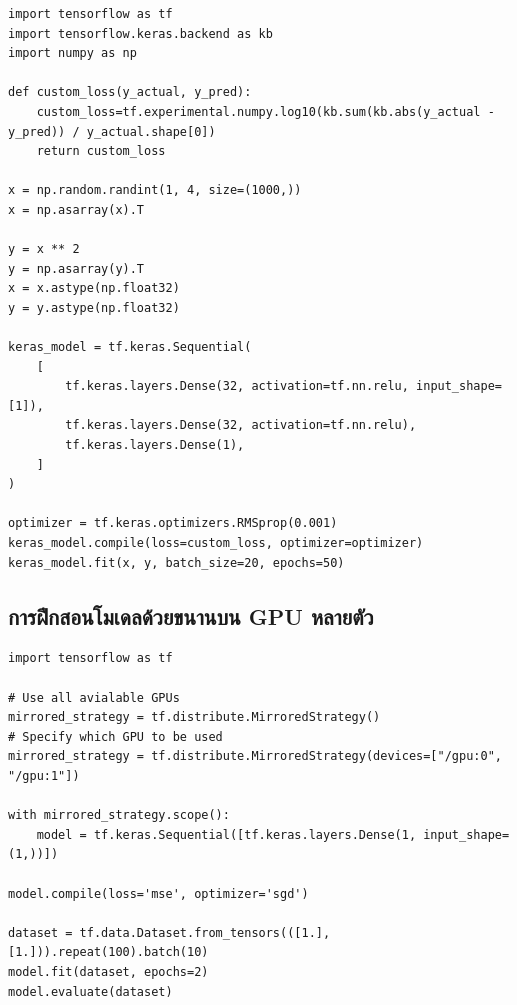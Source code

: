 \begin{lstlisting}[style=MyPython]
import tensorflow as tf
import tensorflow.keras.backend as kb
import numpy as np

def custom_loss(y_actual, y_pred): 
    custom_loss=tf.experimental.numpy.log10(kb.sum(kb.abs(y_actual - y_pred)) / y_actual.shape[0])
    return custom_loss

x = np.random.randint(1, 4, size=(1000,))
x = np.asarray(x).T

y = x ** 2
y = np.asarray(y).T
x = x.astype(np.float32)
y = y.astype(np.float32)

keras_model = tf.keras.Sequential(
    [
        tf.keras.layers.Dense(32, activation=tf.nn.relu, input_shape=[1]),
        tf.keras.layers.Dense(32, activation=tf.nn.relu),
        tf.keras.layers.Dense(1),
    ]
)

optimizer = tf.keras.optimizers.RMSprop(0.001)
keras_model.compile(loss=custom_loss, optimizer=optimizer)
keras_model.fit(x, y, batch_size=20, epochs=50)
\end{lstlisting}

\subsection{การฝึกสอนโมเดลด้วยขนานบน GPU หลายตัว}
\begin{lstlisting}[style=MyPython]
import tensorflow as tf

# Use all avialable GPUs
mirrored_strategy = tf.distribute.MirroredStrategy()
# Specify which GPU to be used
mirrored_strategy = tf.distribute.MirroredStrategy(devices=["/gpu:0", "/gpu:1"])

with mirrored_strategy.scope():
    model = tf.keras.Sequential([tf.keras.layers.Dense(1, input_shape=(1,))])

model.compile(loss='mse', optimizer='sgd')

dataset = tf.data.Dataset.from_tensors(([1.], [1.])).repeat(100).batch(10)
model.fit(dataset, epochs=2)
model.evaluate(dataset)
\end{lstlisting}
